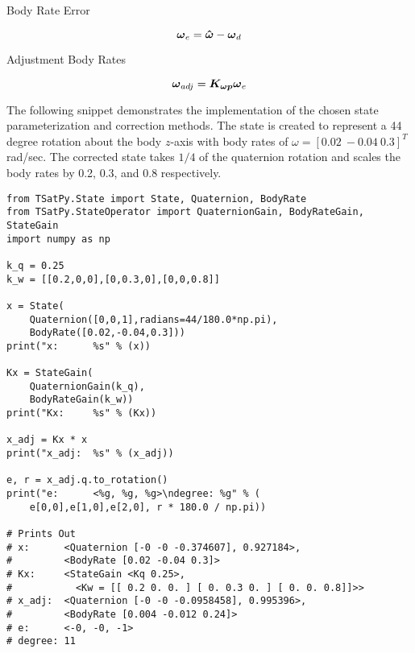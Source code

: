 Body Rate Error

\begin{equation}
  \boldsymbol{\omega}_e = \boldsymbol{\hat{\omega}} - \boldsymbol{\omega}_d
\end{equation}

Adjustment Body Rates

\begin{equation}
  \boldsymbol{\omega}_{adj} = \boldsymbol{K_{\omega p}} \boldsymbol{\omega}_e
\end{equation}

The following snippet demonstrates the implementation of the chosen state parameterization and correction methods.  The state is created to represent a 44 degree rotation about the body $z$-axis with body rates of $\omega = [0.02 \ -0.04 \ 0.3]^T$ rad/sec.  The corrected state takes $1/4$ of the quaternion rotation and scales the body rates by 0.2, 0.3, and 0.8 respectively.

\begin{singlespace}
  \begin{verbatim}
from TSatPy.State import State, Quaternion, BodyRate
from TSatPy.StateOperator import QuaternionGain, BodyRateGain, StateGain
import numpy as np

k_q = 0.25
k_w = [[0.2,0,0],[0,0.3,0],[0,0,0.8]]

x = State(
    Quaternion([0,0,1],radians=44/180.0*np.pi),
    BodyRate([0.02,-0.04,0.3]))
print("x:      %s" % (x))

Kx = StateGain(
    QuaternionGain(k_q),
    BodyRateGain(k_w))
print("Kx:     %s" % (Kx))

x_adj = Kx * x
print("x_adj:  %s" % (x_adj))

e, r = x_adj.q.to_rotation()
print("e:      <%g, %g, %g>\ndegree: %g" % (
    e[0,0],e[1,0],e[2,0], r * 180.0 / np.pi))

# Prints Out
# x:      <Quaternion [-0 -0 -0.374607], 0.927184>,
#         <BodyRate [0.02 -0.04 0.3]>
# Kx:     <StateGain <Kq 0.25>,
#           <Kw = [[ 0.2 0. 0. ] [ 0. 0.3 0. ] [ 0. 0. 0.8]]>>
# x_adj:  <Quaternion [-0 -0 -0.0958458], 0.995396>,
#         <BodyRate [0.004 -0.012 0.24]>
# e:      <-0, -0, -1>
# degree: 11
  \end{verbatim}
\nocite{minted}
\end{singlespace}
